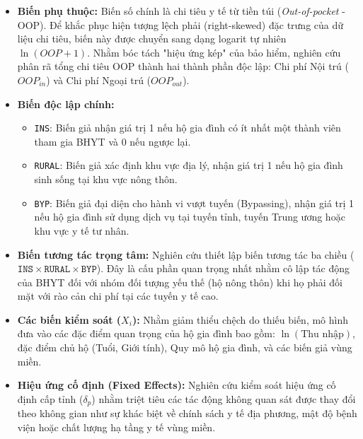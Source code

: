 \documentclass[12pt,a4paper]{article}
\begin{document}
\begin{itemize}
	\item \textbf{Biến phụ thuộc:} Biến số chính là chi tiêu y tế từ tiền túi (\textit{Out-of-pocket} - OOP). Để khắc phục hiện tượng lệch phải (right-skewed) đặc trưng của dữ liệu chi tiêu, biến này được chuyển sang dạng logarit tự nhiên $\ln(OOP + 1)$. Nhằm bóc tách "hiệu ứng kép" của bảo hiểm, nghiên cứu phân rã tổng chi tiêu OOP thành hai thành phần độc lập: Chi phí Nội trú ($OOP_{in}$) và Chi phí Ngoại trú ($OOP_{out}$).
	
	\item \textbf{Biến độc lập chính:}
	\begin{itemize}
		\item \texttt{INS}: Biến giả nhận giá trị 1 nếu hộ gia đình có ít nhất một thành viên tham gia BHYT và 0 nếu ngược lại.
		\item \texttt{RURAL}: Biến giả xác định khu vực địa lý, nhận giá trị 1 nếu hộ gia đình sinh sống tại khu vực nông thôn.
		\item \texttt{BYP}: Biến giả đại diện cho hành vi vượt tuyến (Bypassing), nhận giá trị 1 nếu hộ gia đình sử dụng dịch vụ tại tuyến tỉnh, tuyến Trung ương hoặc khu vực y tế tư nhân.
	\end{itemize}
	
	\item \textbf{Biến tương tác trọng tâm:} Nghiên cứu thiết lập biến tương tác ba chiều ($\texttt{INS} \times \texttt{RURAL} \times \texttt{BYP}$). Đây là cấu phần quan trọng nhất nhằm cô lập tác động của BHYT đối với nhóm đối tượng yếu thế (hộ nông thôn) khi họ phải đối mặt với rào cản chi phí tại các tuyến y tế cao.
	
	\item \textbf{Các biến kiểm soát ($X_i$):} Nhằm giảm thiểu chệch do thiếu biến, mô hình đưa vào các đặc điểm quan trọng của hộ gia đình bao gồm: $\ln(\text{Thu nhập})$, đặc điểm chủ hộ (Tuổi, Giới tính), Quy mô hộ gia đình, và các biến giả vùng miền. 
	
	\item \textbf{Hiệu ứng cố định (Fixed Effects):} Nghiên cứu kiểm soát hiệu ứng cố định cấp tỉnh ($\delta_p$) nhằm triệt tiêu các tác động không quan sát được thay đổi theo không gian như sự khác biệt về chính sách y tế địa phương, mật độ bệnh viện hoặc chất lượng hạ tầng y tế vùng miền.
\end{itemize}
\end{document}
